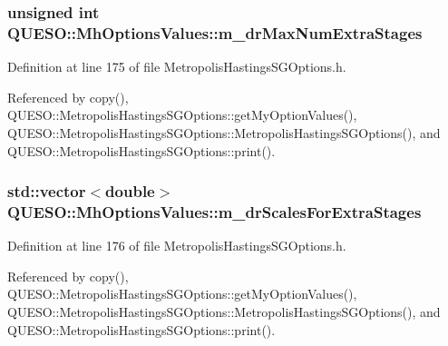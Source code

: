 \hypertarget{class_q_u_e_s_o_1_1_mh_options_values_ab72acd4e4b80dd5c3a4b361466474f21}{
\subsubsection[{m\-\_\-dr\-Max\-Num\-Extra\-Stages}]{\setlength{\rightskip}{0pt plus 5cm}unsigned int Q\-U\-E\-S\-O\-::\-Mh\-Options\-Values\-::m\-\_\-dr\-Max\-Num\-Extra\-Stages}}\label{class_q_u_e_s_o_1_1_mh_options_values_ab72acd4e4b80dd5c3a4b361466474f21}


Definition at line 175 of file Metropolis\-Hastings\-S\-G\-Options.\-h.



Referenced by copy(), Q\-U\-E\-S\-O\-::\-Metropolis\-Hastings\-S\-G\-Options\-::get\-My\-Option\-Values(), Q\-U\-E\-S\-O\-::\-Metropolis\-Hastings\-S\-G\-Options\-::\-Metropolis\-Hastings\-S\-G\-Options(), and Q\-U\-E\-S\-O\-::\-Metropolis\-Hastings\-S\-G\-Options\-::print().

\hypertarget{class_q_u_e_s_o_1_1_mh_options_values_a37774da61eda0aaa92dbcc417944b2e2}{
\subsubsection[{m\-\_\-dr\-Scales\-For\-Extra\-Stages}]{\setlength{\rightskip}{0pt plus 5cm}std\-::vector$<$double$>$ Q\-U\-E\-S\-O\-::\-Mh\-Options\-Values\-::m\-\_\-dr\-Scales\-For\-Extra\-Stages}}\label{class_q_u_e_s_o_1_1_mh_options_values_a37774da61eda0aaa92dbcc417944b2e2}


Definition at line 176 of file Metropolis\-Hastings\-S\-G\-Options.\-h.



Referenced by copy(), Q\-U\-E\-S\-O\-::\-Metropolis\-Hastings\-S\-G\-Options\-::get\-My\-Option\-Values(), Q\-U\-E\-S\-O\-::\-Metropolis\-Hastings\-S\-G\-Options\-::\-Metropolis\-Hastings\-S\-G\-Options(), and Q\-U\-E\-S\-O\-::\-Metropolis\-Hastings\-S\-G\-Options\-::print().

